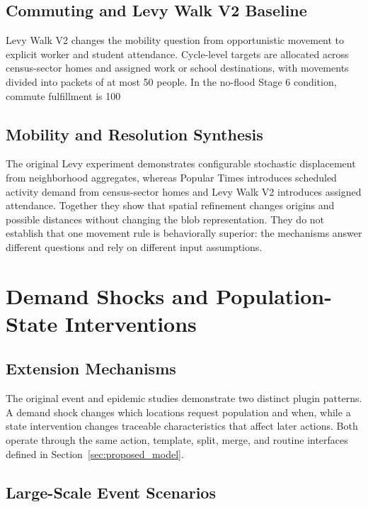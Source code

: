 \documentclass[pdflatex,sn-mathphys-num]{sn-jnl}%
\theoremstyle{thmstyleone}%
\theoremstyle{thmstyletwo}%
\theoremstyle{thmstylethree}%
\begin{document}
\subsection{Commuting and Levy Walk V2 Baseline}

Levy Walk V2 changes the mobility question from opportunistic movement to explicit worker and student attendance. Cycle-level targets are allocated across census-sector homes and assigned work or school destinations, with movements divided into packets of at most 50 people. In the no-flood Stage 6 condition, commute fulfillment is 100%

\subsection{Mobility and Resolution Synthesis}

The original Levy experiment demonstrates configurable stochastic displacement from neighborhood aggregates, whereas Popular Times introduces scheduled activity demand from census-sector homes and Levy Walk V2 introduces assigned attendance. Together they show that spatial refinement changes origins and possible distances without changing the blob representation. They do not establish that one movement rule is behaviorally superior: the mechanisms answer different questions and rely on different input assumptions.

\section{Demand Shocks and Population-State Interventions}
\label{sec:interventions}

\subsection{Extension Mechanisms}

The original event and epidemic studies demonstrate two distinct plugin patterns. A demand shock changes which locations request population and when, while a state intervention changes traceable characteristics that affect later actions. Both operate through the same action, template, split, merge, and routine interfaces defined in Section~\ref{sec:proposed_model}.

\subsection{Large-Scale Event Scenarios}
\label{sec:large_scale}
\end{document}
